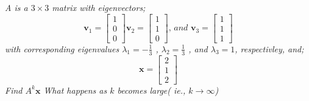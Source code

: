 \documentclass[12pt,letterpaper]{hmcpset}
\begin{document}
\begin{problem}[4.3.18]
\begin{center}
\textit{A is a $3\times3$ matrix with eigenvectors;}
	$$ \textbf{v}_1 = \begin{bmatrix}
	1\\0\\0
	\end{bmatrix} 
	\textbf{v}_2 = \begin{bmatrix}
	1\\1\\0
	\end{bmatrix} \textit{, and }
	\textbf{v}_3 = \begin{bmatrix}
	1\\1\\1
	\end{bmatrix}
	$$ 
	\textit{ with corresponding eigenvalues $\lambda_1= -\frac{1}{3}$ , $\lambda_2= \frac{1}{3}$ , and $\lambda_3= 1$, respectivley, and;}
	$$\textbf{x}= \begin{bmatrix}
	2\\1\\2
\end{bmatrix}
$$
\textit{Find $A^k\textbf{x}$ What happens as $k$ becomes large( ie., $k \rightarrow \infty	$)} 
\end{center}
\end{problem}

\begin{solution}
\end{solution}

\newpage
\end{document}
